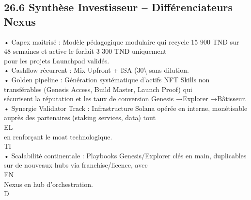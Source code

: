\documentclass[12pt,landscape,a4paper]{article}
\begin{document}
\subsection{26.6 Synthèse Investisseur – Différenciateurs Nexus}
• Capex maîtrisé : Modèle pédagogique modulaire qui recycle 15 900 TND sur 48 semaines et active le forfait 3 300 TND uniquement\\
pour les projets Launchpad validés.\\
\vspace{0.5em}
• Cashflow récurrent : Mix Upfront + ISA (30\textbackslash{}%
sans dilution.\\
\vspace{0.5em}
• Golden pipeline : Génération systématique d’actifs NFT Skills non transférables (Genesis Access, Build Master, Launch Proof) qui\\
sécurisent la réputation et les taux de conversion Genesis →Explorer →Bâtisseur.\\
\vspace{0.5em}
• Synergie Validator Track : Infrastructure Solana opérée en interne, monétisable auprès des partenaires (staking services, data) tout\\
\vspace{0.5em}
\vspace{0.5em}
\vspace{0.5em}
\vspace{0.5em}
EL\\
en renforçant le moat technologique.\\
\vspace{0.5em}
\vspace{0.5em}
\vspace{0.5em}
\vspace{0.5em}
TI\\
• Scalabilité continentale : Playbooks Genesis/Explorer clés en main, duplicables sur de nouveaux hubs via franchise/licence, avec\\
\vspace{0.5em}
\vspace{0.5em}
\vspace{0.5em}
\vspace{0.5em}
EN\\
Nexus en hub d’orchestration.\\
\vspace{0.5em}
\vspace{0.5em}
\vspace{0.5em}
\vspace{0.5em}
D\\
\end{document}
